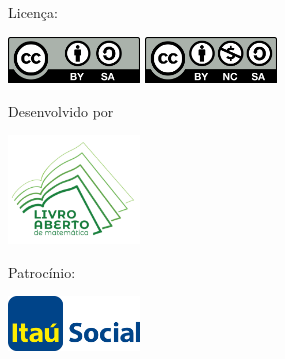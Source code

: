 {	\vfill

	\begin{minipage}{\la@student@textwidth}
		\begin{minipage}[l]{5cm}
			\centering

			{\large Licença:}

			\vspace{1em}

			\ifdefined%
				\la@ccbysa
				\includegraphics[width=3.5cm]{resources/figures/cc-by-sa1}
			\else
				\includegraphics[width=3.5cm]{resources/figures/cc-by-nc-sa}
			\fi

		\end{minipage}
		\hfill
		\begin{minipage}[c]{5cm}
			\centering
			{\large Desenvolvido por}

			\vspace{1em}
			\includegraphics[width=3.5cm]{resources/figures/logo-associacao}
		\end{minipage}
		\hfill
		\begin{minipage}[r]{5cm}
			\centering

			{\large Patrocínio:}

			\vspace{1em}
			\includegraphics[width=3.5cm]{resources/figures/itau}
		\end{minipage}
	\end{minipage}

	\undef\la@author%
	\undef\la@revisao%
	\revisaofalse%
	\authorsfalse%

	\undef\la@versao
	\undef\la@autorcapa
	\undef\la@graficos
	\undef\la@versaodigital
	\undef\la@ccbysa
}
